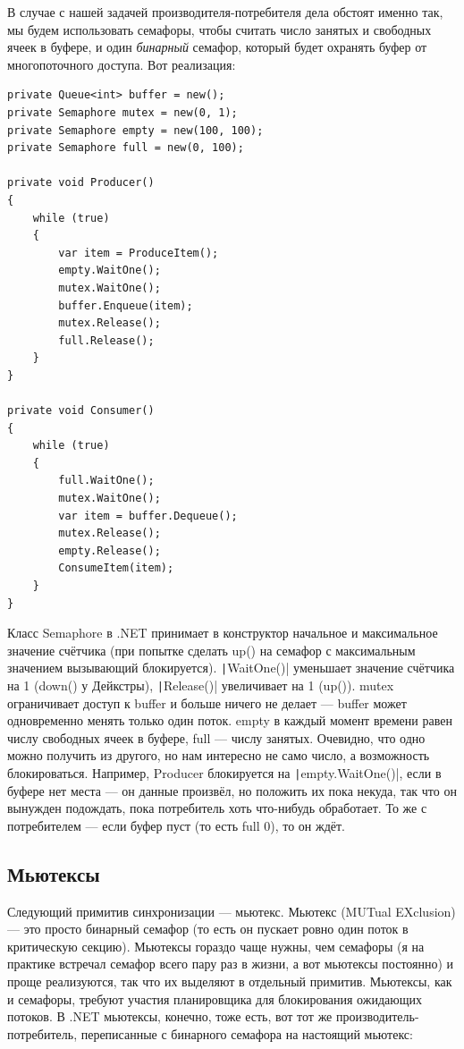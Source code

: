 \documentclass[a5paper]{article}
\begin{document}
В случае с нашей задачей производителя-потребителя дела обстоят именно так, мы будем использовать семафоры, чтобы считать число занятых и свободных ячеек в буфере, и один \textit{бинарный} семафор, который будет охранять буфер от многопоточного доступа. Вот реализация:

\begin{verbatim}
private Queue<int> buffer = new();
private Semaphore mutex = new(0, 1);
private Semaphore empty = new(100, 100);
private Semaphore full = new(0, 100);

private void Producer()
{
    while (true)
    {
        var item = ProduceItem();
        empty.WaitOne();
        mutex.WaitOne();
        buffer.Enqueue(item);
        mutex.Release();
        full.Release();
    }
}

private void Consumer()
{
    while (true)
    {
        full.WaitOne();
        mutex.WaitOne();
        var item = buffer.Dequeue();
        mutex.Release();
        empty.Release();
        ConsumeItem(item);
    }
}
\end{verbatim}

Класс Semaphore в .NET принимает в конструктор начальное и максимальное значение счётчика (при попытке сделать up() на семафор с максимальным значением вызывающий блокируется). \texttt|WaitOne()| уменьшает значение счётчика на 1 (down() у Дейкстры), \texttt|Release()| увеличивает на 1 (up()). mutex ограничивает доступ к buffer и больше ничего не делает --- buffer может одновременно менять только один поток. empty в каждый момент времени равен числу свободных ячеек в буфере, full --- числу занятых. Очевидно, что одно можно получить из другого, но нам интересно не само число, а возможность блокироваться. Например, Producer блокируется на \texttt|empty.WaitOne()|, если в буфере нет места --- он данные произвёл, но положить их пока некуда, так что он вынужден подождать, пока потребитель хоть что-нибудь обработает. То же с потребителем --- если буфер пуст (то есть full 0), то он ждёт.

\subsection{Мьютексы}

Следующий примитив синхронизации --- мьютекс. Мьютекс (MUTual EXclusion) --- это просто бинарный семафор (то есть он пускает ровно один поток в критическую секцию). Мьютексы гораздо чаще нужны, чем семафоры (я на практике встречал семафор всего пару раз в жизни, а вот мьютексы постоянно) и проще реализуются, так что их выделяют в отдельный примитив. Мьютексы, как и семафоры, требуют участия планировщика для блокирования ожидающих потоков. В .NET мьютексы, конечно, тоже есть, вот тот же производитель-потребитель, переписанные с бинарного семафора на настоящий мьютекс:
\end{document}
